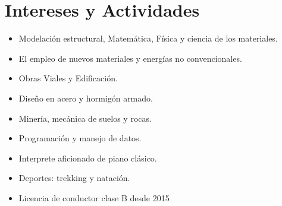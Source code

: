 \documentclass[latterpaper]{article}
\newenvironment{twocollist}{
    \begin{multicols}{2}
    \begin{itemize}
    }{
    \end{itemize}
    \end{multicols}
}
\begin{document}
\section{Intereses y Actividades}

  \begin{twocollist}
            \item Modelación estructural, Matemática, Física y ciencia de los materiales.
            \item El empleo de nuevos materiales y energías no convencionales.
            \item Obras Viales y Edificación.
            \item Diseño en acero y hormigón armado.
            \item Minería, mecánica de suelos y rocas.
            \item Programación y manejo de datos.
            \item Interprete aficionado de piano clásico.
            \item Deportes: trekking y natación.
            \item Licencia de conductor clase B desde 2015

  \end{twocollist}
\end{document}
